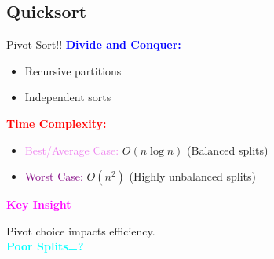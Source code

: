 \documentclass{beamer}
\begin{document}
\subsection{Quicksort}
\begin{frame}{Pivot Sort!!}
    \textbf{\textcolor{blue}{Divide and Conquer:}} 
    \begin{itemize}
        \item Recursive partitions
        \item Independent sorts
    \end{itemize}

    \vspace{0.5cm}
    \textbf{\textcolor{red}{Time Complexity:}}
    \begin{itemize}
        \item \textcolor{violet}{Best/Average Case:} \( O(n\log n) \) (Balanced splits)
        \item \textcolor{purple}{Worst Case:} \( O(n^2) \) (Highly unbalanced splits)
    \end{itemize}

    \vspace{0.5cm}
    \begin{block}{\textbf{\textcolor{magenta}{Key Insight}}}
        \begin{center}
            Pivot choice impacts efficiency.\\
            \textbf{\textcolor{cyan}{Poor Splits=?}} 
        \end{center}
    \end{block}
\end{frame}
\end{document}
